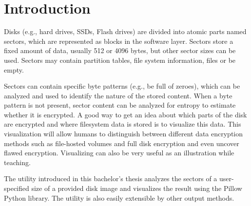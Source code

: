 \documentclass[
  digital, %
  color,   %
  oneside, %
  lof,     %
  nolot,     %
]{fithesis4}
\begin{document}

\chapter*{Introduction}
\label{chap:introduction}

Disks (e.g., hard drives, SSDs, Flash drives) are divided into atomic parts named sectors, which are represented as blocks in the software layer.
Sectors store a fixed amount of data, usually 512 or 4096 bytes, but other sector sizes can be used.
Sectors may contain partition tables, file system information, files or be empty.

Sectors can contain specific byte patterns (e.g., be full of zeroes), which can be analyzed and used to identify the nature of the stored content.
When a byte pattern is not present, sector content can be analyzed for entropy to estimate whether it is encrypted.
A good way to get an idea about which parts of the disk are encrypted and where filesystem data is stored is to visualize this data.
This visualization will allow humans to distinguish between different data encryption methods such as file-hosted volumes and full disk encryption and even uncover flawed encryption.
Visualizing can also be very useful as an illustration while teaching.
 
The utility introduced in this bachelor's thesis analyzes the sectors of a user-specified size of a provided disk image and visualizes the result using the Pillow Python library.
The utility is also easily extensible by other output methods.
\end{document}
